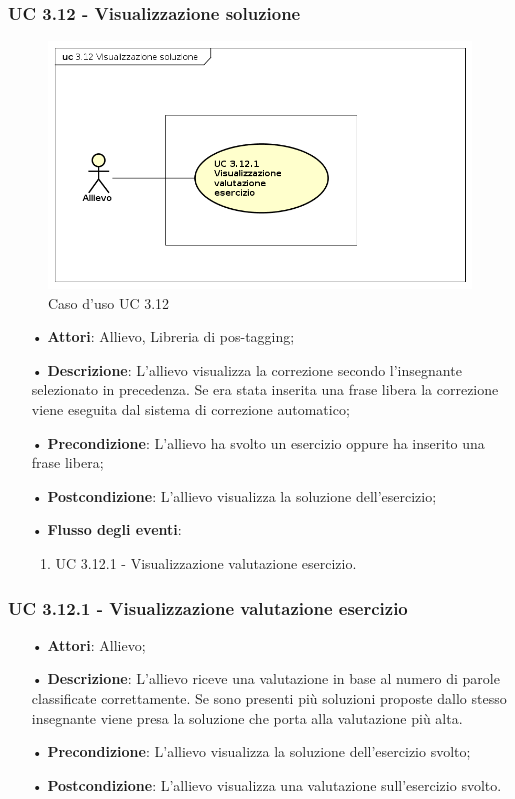\subsubsection{UC 3.12 - Visualizzazione soluzione}
\begin{figure}[H]
	\centering
	\includegraphics[width=17cm]{img/UC312.png} 
	\caption{Caso d'uso UC 3.12}\label{fig:312}
\end{figure}
\begin{itemize}
	\item[•]\textbf{Attori}: Allievo, Libreria di pos-tagging;
	\item[•]\textbf{Descrizione}: L'allievo visualizza la correzione secondo l'insegnante selezionato in precedenza. Se era stata inserita una frase libera la correzione viene eseguita dal sistema di correzione automatico;
	\item[•]\textbf{Precondizione}: L'allievo ha svolto un esercizio oppure ha inserito una frase libera;
	\item[•]\textbf{Postcondizione}: L'allievo visualizza la soluzione dell'esercizio;
	\item[•]\textbf{Flusso degli eventi}:
	\begin{enumerate}
		\item UC 3.12.1 - Visualizzazione valutazione esercizio.  
	\end{enumerate}
\end{itemize}


\subsubsection{UC 3.12.1 - Visualizzazione valutazione esercizio}   

\begin{itemize}
\item[•]\textbf{Attori}: Allievo;
\item[•]\textbf{Descrizione}: L'allievo riceve una valutazione in base al numero di parole classificate correttamente. Se sono presenti più soluzioni proposte dallo stesso insegnante viene presa la soluzione che porta alla valutazione più alta.
\item[•]\textbf{Precondizione}: L'allievo visualizza la soluzione dell'esercizio svolto;
\item[•]\textbf{Postcondizione}: L'allievo visualizza una valutazione sull'esercizio svolto.
\end{itemize}


